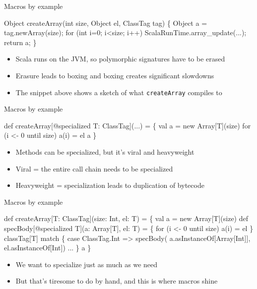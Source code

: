 \documentclass[svgnames,dvipsnames,hyperref={bookmarks=false},usepdftitle=false]{beamer}
\begin{document}
\begin{frame}[fragile]{Macros by example}

\begin{semiverbatim}
Object createArray(int size, Object el, ClassTag tag) \{
  Object a = tag.newArray(size);
  for (int i=0; i<size; i++) ScalaRunTime.array_update(...);
  return a;
\}

\end{semiverbatim}

\begin{itemize}
\item Scala runs on the JVM, so polymorphic signatures have to be erased
\item Erasure leads to boxing and boxing creates significant slowdowns
\item The snippet above shows a sketch of what \texttt{createArray} compiles to
\end{itemize}
\end{frame}

\begin{frame}[fragile]{Macros by example}

\begin{semiverbatim}
def createArray[@specialized T: ClassTag](...) = \{
  val a = new Array[T](size)
  for (i <- 0 until size) a(i) = el
  a
\}

\end{semiverbatim}

\begin{itemize}
\item Methods can be specialized, but it's viral and heavyweight
\item Viral = the entire call chain needs to be specialized
\item Heavyweight = specialization leads to duplication of bytecode
\end{itemize}
\end{frame}

\begin{frame}[fragile]{Macros by example}

\begin{semiverbatim}
def createArray[T: ClassTag](size: Int, el: T) = \{
  val a = new Array[T](size)
  def specBody[@specialized T](a: Array[T], el: T) = \{
    for (i <- 0 until size) a(i) = el
  \}
  classTag[T] match \{
    case ClassTag.Int => specBody(
      a.asInstanceOf[Array[Int]], el.asInstanceOf[Int])
    ...
  \}
  a
\}
\end{semiverbatim}

\begin{itemize}
\item We want to specialize just as much as we need
\item But that's tiresome to do by hand, and this is where macros shine
\end{itemize}
\end{frame}
\end{document}
